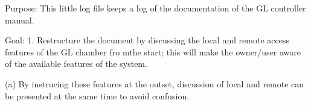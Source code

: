 Purpose:
This little log file keeps a log of the documentation of the GL controller manual. 

Goal: 
1. Restructure the document by discussing the local and remote access features of the GL chamber fro mthe start; this will make the owner/user aware of the available features of the system. 

(a) By instrucing these features at the outset, discussion of local and remote can be presented at the same time to avoid confusion. 


